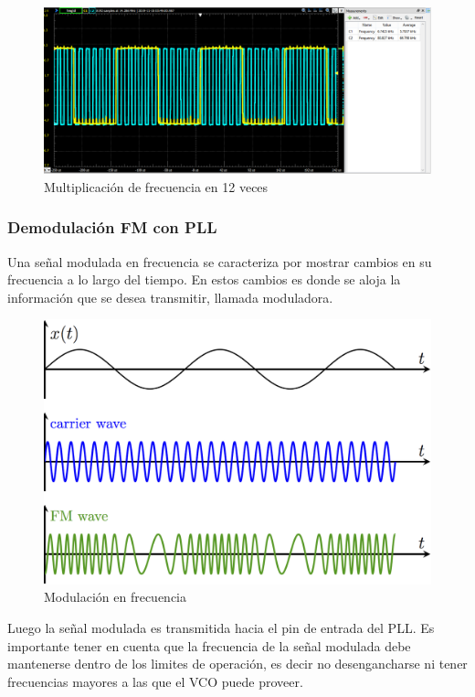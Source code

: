 \begin{figure}[H]
	\centering
	\includegraphics[width=\linewidth]{ImagenesOsciloscopio/SintetizadorFrecuencias3.PNG}
	\caption{Multiplicación de frecuencia en 12 veces}
	\label{freqsynth12}
\end{figure}


\subsubsection{Demodulación FM con PLL}
Una señal modulada en frecuencia se caracteriza por mostrar cambios en su frecuencia a lo largo del tiempo. En estos cambios es donde se aloja la información que se desea transmitir, llamada moduladora.

\begin{figure}[H]
	\centering
	\includegraphics[scale=0.5]{ImagenesVarias/FMmodulation1.png}
	\caption{Modulación en frecuencia}
	\label{freqmod1}
\end{figure}

Luego la señal modulada es transmitida hacia el pin de entrada del PLL. Es importante tener en cuenta que la frecuencia de la señal modulada debe mantenerse dentro de los limites de operación, es decir no desengancharse ni tener frecuencias mayores a las que el VCO puede proveer.

